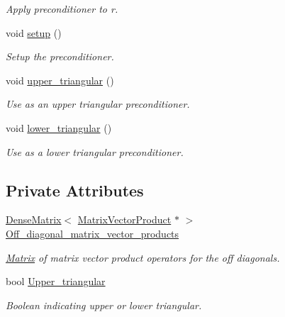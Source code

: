 \begin{DoxyCompactItemize}
\begin{DoxyCompactList}\small\item\em Apply preconditioner to r. \end{DoxyCompactList}\item 
void \hyperlink{classoomph_1_1BlockTriangularPreconditioner_a2d08f17f9ba08a5772cb32fabcd4f984}{setup} ()
\begin{DoxyCompactList}\small\item\em Setup the preconditioner. \end{DoxyCompactList}\item 
void \hyperlink{classoomph_1_1BlockTriangularPreconditioner_a570f6526506d6f62df87dffdd717ab21}{upper\+\_\+triangular} ()
\begin{DoxyCompactList}\small\item\em Use as an upper triangular preconditioner. \end{DoxyCompactList}\item 
void \hyperlink{classoomph_1_1BlockTriangularPreconditioner_aa87bdcf9f0cdcaa787786207bb6356b5}{lower\+\_\+triangular} ()
\begin{DoxyCompactList}\small\item\em Use as a lower triangular preconditioner. \end{DoxyCompactList}\end{DoxyCompactItemize}
\subsection*{Private Attributes}
\begin{DoxyCompactItemize}
\item 
\hyperlink{classoomph_1_1DenseMatrix}{Dense\+Matrix}$<$ \hyperlink{classoomph_1_1MatrixVectorProduct}{Matrix\+Vector\+Product} $\ast$ $>$ \hyperlink{classoomph_1_1BlockTriangularPreconditioner_a163b9d6b63c1117d4e784bc1e32d1975}{Off\+\_\+diagonal\+\_\+matrix\+\_\+vector\+\_\+products}
\begin{DoxyCompactList}\small\item\em \hyperlink{classoomph_1_1Matrix}{Matrix} of matrix vector product operators for the off diagonals. \end{DoxyCompactList}\item 
bool \hyperlink{classoomph_1_1BlockTriangularPreconditioner_afdab4f2510ef81938b177c65609f6d39}{Upper\+\_\+triangular}
\begin{DoxyCompactList}\small\item\em Boolean indicating upper or lower triangular. \end{DoxyCompactList}\end{DoxyCompactItemize}
